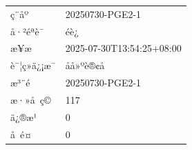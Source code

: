 \documentclass[UTF8,10pt,a4paper,fontset=fandol]{ctexart}
\newcommand{\fieldvalue}[1]{#1}
\begin{document}
\begin{tabular}{ll}
ç¨åº &
\fieldvalue{20250730-PGE2-1}\\
å·²éªè¯ &
\fieldvalue{éè¿}\\
æ¥æ &
\fieldvalue{2025-07-30T13:54:25+08:00}\\
è¯¦ç»ä¿¡æ¯ &
\fieldvalue{åå»ºè®¢å}\\
æ³¨é &
\fieldvalue{20250730-PGE2-1}\\[2pt]

æ·»å ç© &
\fieldvalue{117}\\
ä¿®æ¹ &
\fieldvalue{0}\\
å é¤ &
\fieldvalue{0}\\[2pt]


\end{tabular}
\end{document}
